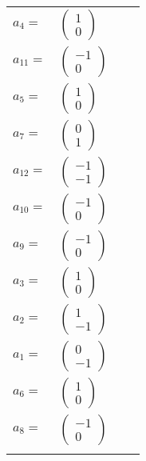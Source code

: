 \documentclass[1p]{elsarticle_modified}
\theoremstyle{definition}
\begin{document}
\begin{tabular}{m{7pt} m{180pt} m{7pt} m{180pt} }
\flushright $a_{4}=$&$\begin{pmatrix}1\\0\end{pmatrix}$ \\
\flushright $a_{11}=$&$\begin{pmatrix}-1\\0\end{pmatrix}$ \\
\flushright $a_{5}=$&$\begin{pmatrix}1\\0\end{pmatrix}$ \\
\flushright $a_{7}=$&$\begin{pmatrix}0\\1\end{pmatrix}$ \\
\flushright $a_{12}=$&$\begin{pmatrix}-1\\-1\end{pmatrix}$ \\
\flushright $a_{10}=$&$\begin{pmatrix}-1\\0\end{pmatrix}$ \\
\flushright $a_{9}=$&$\begin{pmatrix}-1\\0\end{pmatrix}$ \\
\flushright $a_{3}=$&$\begin{pmatrix}1\\0\end{pmatrix}$ \\
\flushright $a_{2}=$&$\begin{pmatrix}1\\-1\end{pmatrix}$ \\
\flushright $a_{1}=$&$\begin{pmatrix}0\\-1\end{pmatrix}$ \\
\flushright $a_{6}=$&$\begin{pmatrix}1\\0\end{pmatrix}$ \\
\flushright $a_{8}=$&$\begin{pmatrix}-1\\0\end{pmatrix}$\\&\end{tabular}
\end{document}
